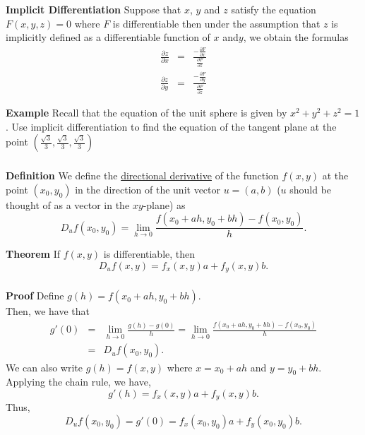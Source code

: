\begin{frame}[fragile]\frametitle{}
\textbf{Implicit Differentiation}
Suppose that $x$, $y$ and $z$ satisfy the equation $F(x,y,z)=0$ where $F$ is differentiable then under the assumption that $z$ is implicitly defined as a differentiable function of $x$ and$y$, we obtain the formulas
\begin{eqnarray*}
\frac{\partial z}{\partial x} &=& \frac{-  \frac{\partial F}{\partial x}}{\frac{\partial F}{\partial z}}  \\
\frac{\partial z}{\partial y} &=& \frac{-  \frac{\partial F}{\partial y}}{\frac{\partial F}{\partial z}}
\end{eqnarray*}
  

\textbf{Example}
Recall that the equation of the unit sphere is given by $x^2+y^2+z^2=1$.  Use implicit differentiation to find the equation of the tangent plane at the point $\left(\frac{\sqrt{3}}{3}, \frac{\sqrt{3}}{3}, \frac{\sqrt{3}}{3} \right)$

\end{frame}



\begin{frame}[fragile]\frametitle{}
\textbf{Definition}
We define the \underline{directional derivative} of the function $f(x,y)$ at the point $(x_0,y_0)$ in the direction of the unit vector 
$u=(a,b)$ ($u$ should be thought of as a vector in the $xy$-plane) as
$$
  D_u f(x_0,y_0) = \lim_{h\rightarrow 0} \frac{f(x_0+ah,y_0+bh)-f(x_0,y_0)}{h}.
$$
  

\textbf{Theorem}
If $f(x,y)$ is differentiable, then 
$$
D_u f(x,y) = f_x(x,y)a+f_y(x,y)b.
$$

\end{frame}



\begin{frame}[fragile]\frametitle{}
\textbf{Proof}
Define $g(h) = f(x_0+ah,y_0+bh)$.    \\ 
Then, we have that   \\
\begin{eqnarray*}
g'(0)&=& \lim_{h\rightarrow 0}\frac{g(h)-g(0)}{h} =
        \lim_{h\rightarrow 0}\frac{f(x_0+ah,y_0+bh)-f(x_0,y_0)}{h} \\ 
        &=&D_u f(x_0,y_0).
\end{eqnarray*}  
We can also write $g(h)=f(x,y)$ where $x=x_0+ah$ and $y=y_0+bh$.  \\ 
Applying the chain rule, we have,
$$
g'(h)=f_x(x,y)a+f_y(x,y)b.
$$ 
Thus, 
$$
D_u f(x_0,y_0)= g'(0) = f_x(x_0,y_0)a+f_y(x_0,y_0)b.
$$

\end{frame}


